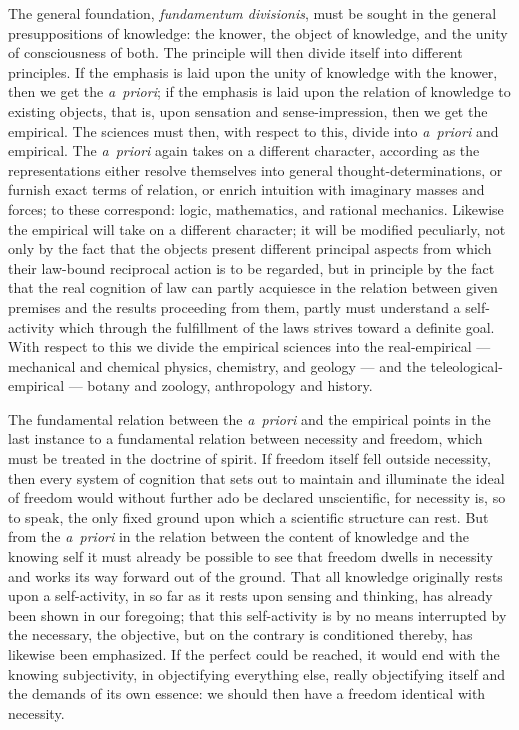 \documentclass[12pt]{book}
\begin{document}
The general foundation, \textit{fundamentum divisionis}, must be sought in the
general presuppositions of knowledge: the knower, the object of knowledge, and
the unity of consciousness of both. The principle will then divide itself into
different principles. If the emphasis is laid upon the unity of knowledge with
the knower, then we get the \textit{a~priori}; if the emphasis is laid upon the
relation of knowledge to existing objects, that is, upon sensation and
sense-impression, then we get the empirical. The sciences must then, with respect
to this, divide into \textit{a~priori} and empirical. The \textit{a~priori}
again takes on a different character, according as the representations either
resolve themselves into general thought-determinations, or furnish exact terms of
relation, or enrich intuition with imaginary masses and forces; to these
correspond: logic, mathematics, and rational mechanics. Likewise the empirical
will take on a different character; it will be modified peculiarly, not only by
the fact that the objects present different principal aspects from which their
law-bound reciprocal action is to be regarded, but in principle by the fact that
the real cognition of law can partly acquiesce in the relation between given
premises and the results proceeding from them, partly must understand a
self-activity which through the fulfillment of the laws strives toward a definite
goal. With respect to this we divide the empirical sciences into the
real-empirical --- mechanical and chemical physics, chemistry, and geology ---
and the teleological-empirical --- botany and zoology, anthropology and history.

The fundamental relation between the \textit{a~priori} and the empirical points
in the last instance to a fundamental relation between necessity and freedom,
which must be treated in the doctrine of spirit. If freedom itself fell outside
necessity, then every system of cognition that sets out to maintain and
illuminate the ideal of freedom would without further ado be declared
unscientific, for necessity is, so to speak, the only fixed ground upon which a
scientific structure can rest. But from the \textit{a~priori} in the relation
between the content of knowledge and the knowing self it must already be possible
to see that freedom dwells in necessity and works its way forward out of the
ground. That all knowledge originally rests upon a self-activity, in so far as it
rests upon sensing and thinking, has already been shown in our foregoing; that
this self-activity is by no means interrupted by the necessary, the objective,
but on the contrary is conditioned thereby, has likewise been emphasized. If the
perfect could be reached, it would end with the knowing subjectivity, in
objectifying everything else, really objectifying itself and the demands of its
own essence: we should then have a freedom identical with necessity.
\end{document}
